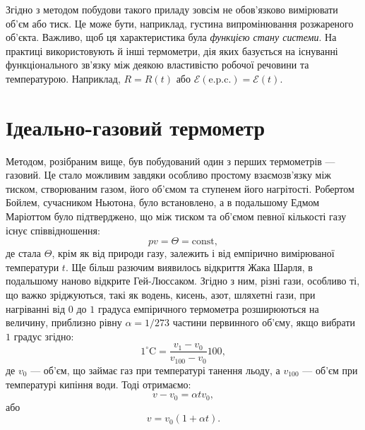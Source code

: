 Згідно з методом побудови такого приладу зовсім не обов'язково вимірювати об'єм або тиск. Це може
бути,
наприклад, густина випромінювання розжареного об'єкта. Важливо, щоб ця характеристика була
\emph{функцією стану системи}. На практиці використовують й інші термометри, дія яких базується на
існуванні функціонального зв'язку між деякою властивістю робочої речовини та температурою. Наприклад,
$R=R(t)$  або $\mathcal{E}(\text{e.p.c.})=\mathcal{E}(t)$.

\section{Ідеально-газовий термометр}

Методом, розібраним вище, був побудований  один з перших термометрів --- газовий. Це стало можливим
завдяки особливо простому взаємозв'язку між тиском, створюваним газом, його об'ємом та ступенем
його
нагрітості. Робертом Бойлем, сучасником Ньютона, було встановлено, а в подальшому Едмом Маріоттом було
підтверджено, що між тиском та об'ємом певної кількості газу існує співвідношення:
\begin{equation}\label{eq:pv}
	pv = \Theta = \mathrm{const},
\end{equation}
де стала $\Theta$, крім як від природи газу, залежить і від емпірично вимірюваної температури $t$.
Ще більш разючим виявилось відкриття Жака Шарля, в подальшому наново відкрите Гей-Люссаком. Згідно з
ним, різні гази, особливо ті, що важко зріджуються, такі як водень, кисень, азот, шляхетні гази,
при
нагріванні від $0$ до $1$ градуса емпіричного термометра розширюються на величину, приблизно рівну
$\alpha=1/273$ частини первинного об'єму, якщо вибрати $1$ градус згідно:
\begin{equation}
	1^\circ\text{C} = \frac{v_1 - v_0}{v_{100} - v_0} 100,
\end{equation}
де $v_0$ --- об’єм, що займає газ при температурі танення льоду, а $v_{100}$ --- об’єм при
температурі
кипіння
води. Тоді отримаємо:
\begin{equation}
	v-v_0=\alpha t v_0,
\end{equation}
або
\begin{equation}\label{eq:v}
	v=v_0 (1+\alpha t).
\end{equation}


